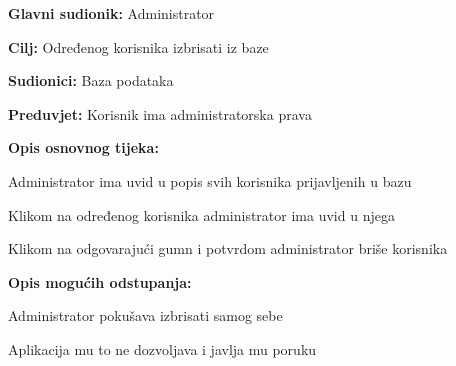 					\noindent {}
					\begin{packed_item}
	
						\item \textbf{Glavni sudionik: }Administrator
						\item  \textbf{Cilj: }Određenog korisnika izbrisati iz baze
						\item  \textbf{Sudionici: }Baza podataka
						\item  \textbf{Preduvjet: }Korisnik ima administratorska prava
						\item  \textbf{Opis osnovnog tijeka:}
						
						\item[] \begin{packed_enum}
							\item Administrator ima uvid u popis svih korisnika prijavljenih u bazu
							\item Klikom na određenog korisnika administrator ima uvid u njega
							\item Klikom na odgovarajući gumn i potvrdom administrator briše korisnika
						\end{packed_enum}
						
						\item  \textbf{Opis mogućih odstupanja:}
						
						\item[] \begin{packed_item}
	
							\item[3.a] Administrator pokušava izbrisati samog sebe 
							\item[] \begin{packed_enum}
								\item Aplikacija mu to ne dozvoljava i javlja mu poruku
							\end{packed_enum}
						\end{packed_item}
					\end{packed_item}
					
